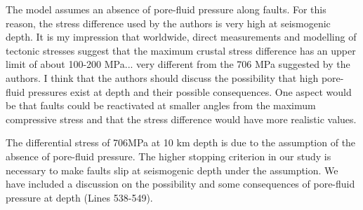 \documentclass[12pt]{article}
\begin{document}
\begin{response}{The model assumes an absence of pore-fluid pressure along faults. For this reason, the stress difference used by the authors is very high at seismogenic depth. It is my impression that worldwide, direct measurements and modelling of tectonic stresses suggest that the maximum crustal stress difference has an upper limit of about 100-200 MPa... very different from the 706 MPa suggested by the authors.
I think that the authors should discuss the possibility that high pore-fluid pressures exist at depth and their possible consequences. One aspect would be that faults could be reactivated at smaller angles from the maximum compressive stress and that the stress difference would have more realistic values.}

  The differential stress of 706MPa at 10 km depth is due to the assumption of the absence of pore-fluid pressure. The higher stopping criterion in our study is necessary to make faults slip at seismogenic depth under the assumption. We have included a discussion on the possibility and some consequences of pore-fluid pressure at depth (Lines 538-549).
\end{response}
\end{document}
